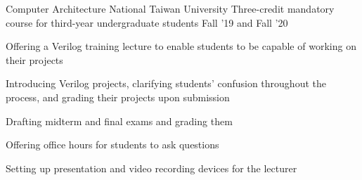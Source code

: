 

\begin{cventries}
\cvproject
    {Computer Architecture}
    {National Taiwan University}
    {Three-credit mandatory course for third-year undergraduate students}
    {Fall '19 and Fall '20}
    {
        \begin{cvitems}
        \item Offering a Verilog training lecture to enable students to be capable of working on their projects
        \item Introducing Verilog projects, clarifying students' confusion throughout the process, and grading their projects upon submission
        \item Drafting midterm and final exams and grading them
        \item Offering office hours for students to ask questions
        \item Setting up presentation and video recording devices for the lecturer
        \end{cvitems}
    }
\end{cventries}
